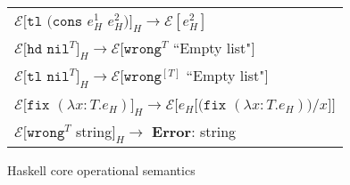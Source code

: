 \begin{figure}[p]
\begin{tabular}{l}
\vspace{5pt}

$\mathscr{E}[\mathtt{tl}$ $(\mathtt{cons}$ $e_{H}^{1}$ $e_{H}^{2})]_{H}\rightarrow\mathscr{E}[e_{H}^{2}]$ \\

\vspace{5pt}

$\mathscr{E}[\mathtt{hd}$ $\mathtt{nil}^{T}]_{H}\rightarrow\mathscr{E}[\mathtt{wrong}^{T}$ ``Empty list"$]$ \\

\vspace{5pt}

$\mathscr{E}[\mathtt{tl}$ $\mathtt{nil}^{T}]_{H}\rightarrow\mathscr{E}[\mathtt{wrong}^{[T]}$ ``Empty list"$]$ \\

\vspace{5pt}

$\mathscr{E}[\mathtt{fix}$ $(\lambda x:T.e_{H})]_{H}\rightarrow\mathscr{E}[e_{H}[(\mathtt{fix}$ $(\lambda x:T.e_{H}))/x]]$ \\

\vspace{5pt}

$\mathscr{E}[\mathtt{wrong}^{T}$ string$]_{H}\rightarrow$ \textbf{Error}: string
\end{tabular}
\caption{Haskell core operational semantics}
\label{chos}
\end{figure}